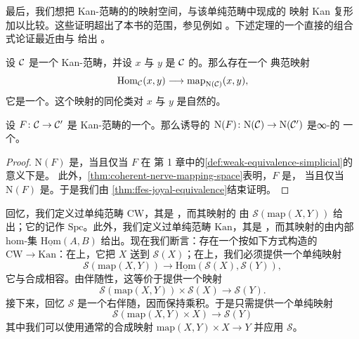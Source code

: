 最后，我们想把 Kan-\trEnrichment{}范畴的\trCoherentNerve{}的映射空间，与该单纯范畴中现成的
映射 Kan 复形加以比较。这些证明超出了本书的范围，参见例如
\cite[Section 2.2.2]{Lur09}。下述定理的一个直接的组合式论证最近由\trHebestreit{}与%
\trKrause{}给出 \cite{HK20}。

\begin{theorem}\label{thm:coherent-nerve-mapping-space}
设 $\mathcal{C}$ 是一个 Kan-\trEnrichment{}范畴，并设 $x$ 与 $y$ 是 $\mathcal{C}$ 的\trObject{}。那么存在一个
典范映射
\[
\mathrm{Hom}_{\mathcal{C}}(x, y) \longrightarrow \mathrm{map}_{\mathrm{N}(\mathcal{C})}(x, y),
\]
它是一个\trHomotopyEquivalence{}。这个映射的同伦类对 $x$ 与 $y$ 是自然的。
\end{theorem}

\begin{corollary}\label{cor:nerve-weak-equivalence}
设 $F\colon \mathcal{C} \to \mathcal{C}'$ 是 Kan-\trEnrichment{}范畴的一个\trWeakEquivalence{}。那么诱导的%
\trFunctor{} $\mathrm{N}(F)\colon \mathrm{N}(\mathcal{C}) \to \mathrm{N}(\mathcal{C}')$ 是∞-\trCategories{}的
一个\trJoyalEquivalence{}。
\end{corollary}

\begin{proof}
\trFunctor{} $\mathrm{N}(F)$ 是\trEssentiallySurjective{}，当且仅当 $F$ 在%
第 1 章中的\cref{def:weak-equivalence-simplicial}的意义下是\trWeaklyEssentiallySurjective{}。
此外，\cref{thm:coherent-nerve-mapping-space}表明，$F$ 是\trWeaklyFullyFaithful{}，
当且仅当 $\mathrm{N}(F)$ 是\trFullyFaithful{}。于是我们由%
\cref{thm:ffes-joyal-equivalence}结束证明。
\end{proof}

回忆，我们定义过单纯范畴 $\mathrm{CW}$，其\trObject{}是 \trCWComplex{}，而其映射的%
\trSimplicialSet{}由 $\mathcal{S}(\mathrm{map}(X, Y))$ 给出；它的\trCoherentNerve{}记作
$\mathrm{Spc}$。此外，我们定义过单纯范畴 $\mathrm{Kan}$，其\trObject{}是%
\trKanComplex{}，而其映射的\trSimplicialSet{}由内部 hom-集
$\underline{\mathrm{Hom}}(A, B)$ 给出。现在我们断言：存在一个按如下方式构造的%
\trFunctor{} $\mathrm{CW} \to \mathrm{Kan}$：在\trObject{}上，它把 $X$ 送到
$\mathcal{S}(X)$；在\trMorphism{}上，我们必须提供一个单纯映射
\[
\mathcal{S}(\mathrm{map}(X, Y)) \longrightarrow
\underline{\mathrm{Hom}}(\mathcal{S}(X), \mathcal{S}(Y)),
\]
它与合成相容。由伴随性，这等价于提供一个映射
\[
\mathcal{S}(\mathrm{map}(X, Y)) \times \mathcal{S}(X) \longrightarrow \mathcal{S}(Y).
\]
接下来，回忆 $\mathcal{S}$ 是一个右伴随，因而保持乘积。于是只需提供一个单纯映射
\[
\mathcal{S}(\mathrm{map}(X, Y) \times X) \longrightarrow \mathcal{S}(Y)
\]
其中我们可以使用通常的合成映射 $\mathrm{map}(X, Y) \times X \to Y$ 并应用%
\trFunctor{} $\mathcal{S}$。

